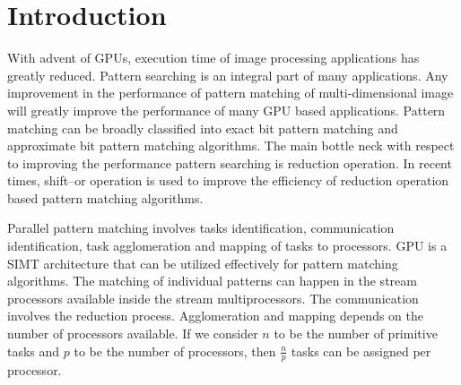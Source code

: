 \documentclass[graybox]{svmult}
\begin{document}

\section{Introduction}
\label{sec:1}
With advent of GPUs, execution time of image processing applications has greatly reduced. Pattern searching is an integral part of many applications. Any improvement in the performance of pattern matching of multi-dimensional image will greatly improve the performance of many GPU based applications. Pattern matching can be broadly classified into exact bit pattern matching and approximate bit pattern matching algorithms. The main bottle neck with respect to improving the performance pattern searching is reduction operation. In recent times, shift–or operation is used to improve the efficiency of reduction operation based pattern matching algorithms.

Parallel pattern matching involves tasks identification, communication identification, task agglomeration and mapping of tasks to processors. GPU is a SIMT architecture that can be utilized effectively for pattern matching algorithms. The matching of individual patterns can happen in the stream processors available inside the stream multiprocessors. The communication involves the reduction process. Agglomeration and mapping depends on the number of processors available. If we consider $n$ to be the number of primitive tasks and $p$ to be the number of processors, then $\frac{n}{p}$ tasks can be assigned per processor.
\end{document}
